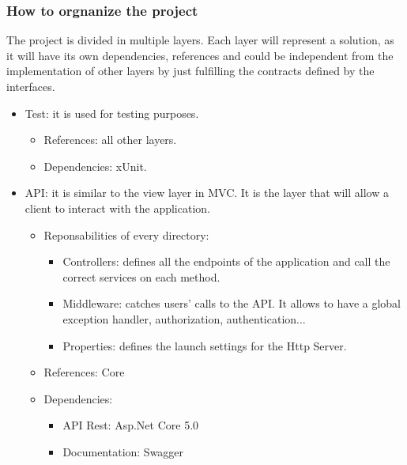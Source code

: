         \subsubsection{How to orgnanize the project}
            The project is divided in multiple layers. Each layer will represent a solution, as it will have its own dependencies, references 
            and could be independent from the implementation of other layers by just fulfilling the contracts defined by the interfaces.
            \begin{itemize}[noitemsep]
                \item Test: it is used for testing purposes.
                    \begin{itemize}[noitemsep]
                        \item References: all other layers.
                        \item Dependencies: xUnit.
                    \end{itemize}
                \item API: it is similar to the view layer in MVC. It is the layer that will allow a client to interact with the application.
                    \begin{itemize}[noitemsep]
                    \item Reponsabilities of every directory:
                            \begin{itemize}[noitemsep]
                                \item Controllers: defines all the endpoints of the application and call the correct services on each method.
                                \item Middleware: catches users' calls to the API. It allows to have a global exception handler, authorization, authentication...
                                \item Properties: defines the launch settings for the Http Server.
                            \end{itemize}
                        \item References: Core
                        \item Dependencies:
                            \begin{itemize}[noitemsep]
                                \item API Rest: Asp.Net Core 5.0
                                \item Documentation: Swagger
                            \end{itemize}

\end{itemize}
\end{itemize}
